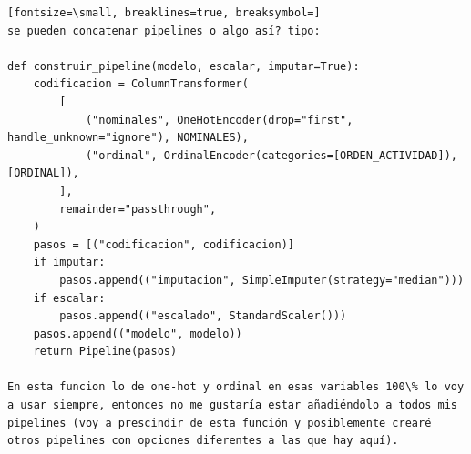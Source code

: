 \documentclass[12pt,a4paper,oneside]{book}
\begin{document}
\begin{iaprompt}
\begin{Verbatim}[fontsize=\small, breaklines=true, breaksymbol=]
se pueden concatenar pipelines o algo así? tipo:

def construir_pipeline(modelo, escalar, imputar=True):
    codificacion = ColumnTransformer(
        [
            ("nominales", OneHotEncoder(drop="first", handle_unknown="ignore"), NOMINALES),
            ("ordinal", OrdinalEncoder(categories=[ORDEN_ACTIVIDAD]), [ORDINAL]),
        ],
        remainder="passthrough",
    )
    pasos = [("codificacion", codificacion)]
    if imputar:
        pasos.append(("imputacion", SimpleImputer(strategy="median")))
    if escalar:
        pasos.append(("escalado", StandardScaler()))
    pasos.append(("modelo", modelo))
    return Pipeline(pasos)

En esta funcion lo de one-hot y ordinal en esas variables 100\% lo voy a usar siempre, entonces no me gustaría estar añadiéndolo a todos mis pipelines (voy a prescindir de esta función y posiblemente crearé otros pipelines con opciones diferentes a las que hay aquí).
\end{Verbatim}
\end{iaprompt}
\end{document}
